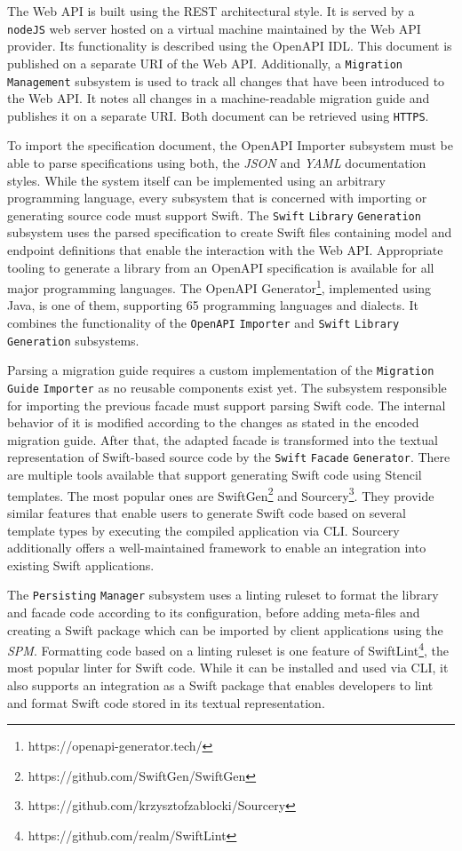 The Web API is built using the \ac{REST} architectural style. It is served by a \texttt{nodeJS} web server hosted on a virtual machine maintained by the Web API provider. Its functionality is described using the OpenAPI \ac{IDL}. This document is published on a separate URI of the Web API. Additionally, a \texttt{Migration Management} subsystem is used to track all changes that have been introduced to the Web API. It notes all changes in a machine-readable migration guide and publishes it on a separate URI. Both document can be retrieved using \texttt{HTTPS}. 

To import the specification document, the OpenAPI Importer subsystem must be able to parse specifications using both, the \textit{\ac{JSON}} and \textit{\ac{YAML}} documentation styles. While the system itself can be implemented using an arbitrary programming language, every subsystem that is concerned with importing or generating source code must support Swift. The \texttt{Swift} \texttt{Library} \texttt{Gen\-er\-ation} subsystem uses the parsed specification to create Swift files containing model and endpoint definitions that enable the interaction with the Web API. Appropriate tooling to generate a library from an OpenAPI specification is available for all major programming languages. The OpenAPI Generator\footnote{https://openapi-generator.tech/}, implemented using Java, is one of them, supporting 65 programming languages and dialects. It combines the functionality of the \texttt{OpenAPI} \texttt{Importer} and \texttt{Swift} \texttt{Library} \texttt{Gen\-er\-ation} subsystems.

Parsing a migration guide requires a custom implementation of the \texttt{Migration} \texttt{Guide} \texttt{Importer} as no reusable components exist yet. The subsystem responsible for importing the previous facade must support parsing Swift code. The internal behavior of it is modified according to the changes as stated in the encoded migration guide. After that, the adapted facade is transformed into the textual representation of Swift-based source code by the \texttt{Swift} \texttt{Facade} \texttt{Generator}. There are multiple tools available that support generating Swift code using Stencil templates. The most popular ones are SwiftGen\footnote{https://github.com/SwiftGen/SwiftGen} and Sourcery\footnote{https://github.com/krzysztofzablocki/Sourcery}. They provide similar features that enable users to generate Swift code based on several template types by executing the compiled application via CLI. Sourcery additionally offers a well-maintained framework to enable an integration into existing Swift applications.

The \texttt{Persisting} \texttt{Manager} subsystem uses a linting ruleset to format the library and facade code according to its configuration, before adding meta-files and creating a Swift package which can be imported by client applications using the \textit{\ac{SPM}}. Formatting code based on a linting ruleset is one feature of SwiftLint\footnote{https://github.com/realm/SwiftLint}, the most popular linter for Swift code. While it can be installed and used via CLI, it also supports an integration as a Swift package that enables developers to lint and format Swift code stored in its textual representation.